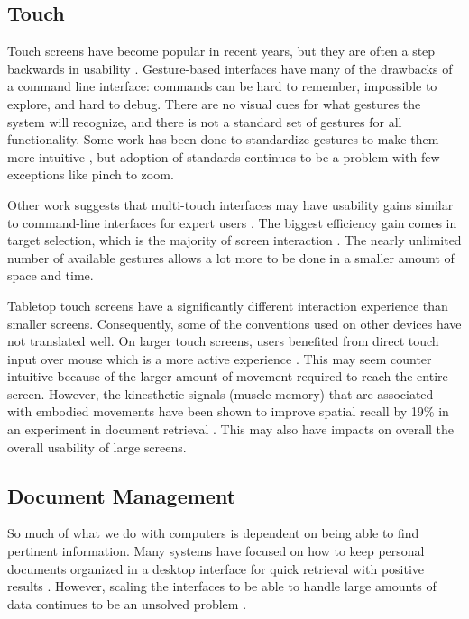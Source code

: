 \documentclass{article}
\begin{document}
\subsection{Touch}
Touch screens have become popular in recent years, but they are often a step backwards in usability \cite{Norman2010}.  Gesture-based interfaces have many of the drawbacks of a command line interface: commands can be hard to remember, impossible to explore, and hard to debug.  There are no visual cues for what gestures the system will recognize, and there is not a standard set of gestures for all functionality.   Some work has been done to standardize gestures to make them more intuitive \cite{North2009}, but adoption of standards continues to be a problem with few exceptions like pinch to zoom.  

	Other work suggests that multi-touch interfaces may have usability gains similar to command-line interfaces for expert users \cite{Forlines2007} \cite{Tan2002} \cite{North2009}. The biggest efficiency gain comes in target selection, which is the majority of screen interaction \cite{Forlines2007}.  The nearly unlimited number of available gestures allows a lot more to be done in a smaller amount of space and time.  
	
	Tabletop touch screens have a significantly different interaction experience than smaller screens.  Consequently, some of the conventions used on other devices have not translated well.  On larger touch screens, users benefited from direct touch input over mouse which is a more active experience \cite{Kristensson2008}.  This may seem counter intuitive because of the larger amount of movement required to reach the entire screen. However, the kinesthetic signals (muscle memory) that are associated with embodied movements have been shown to improve spatial recall by 19\% in an experiment in document retrieval \cite{Tan2002}. This may also have impacts on overall the overall usability of large screens.


\subsection{Document Management}

So much of what we do with computers is dependent on being able to find pertinent information.  Many systems have focused on how to keep personal documents organized in a desktop interface for quick retrieval with positive results \cite{Agarawala2006} \cite{Foo2007:ECDL} \cite{Foo2007:ICADL}. However, scaling the interfaces to be able to handle large amounts of data continues to be an unsolved problem \cite{Whittaker2001}.
\end{document}
